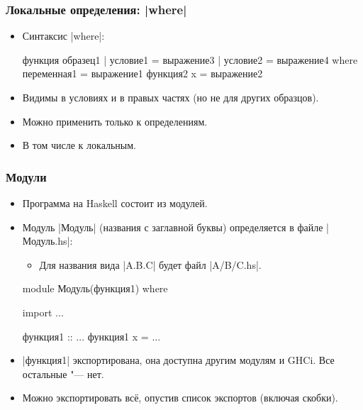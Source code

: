 \documentclass[10pt]{beamer}
\begin{document}
\begin{frame}[fragile]
  \frametitle{Локальные определения: \haskinline|where|}
  \begin{itemize}
    \item Синтаксис \haskinline|where|:
          \begin{haskell}
            функция образец1 | условие1 = выражение3
                             | условие2 = выражение4
                where переменная1 = выражение1
                      функция2 x = выражение2
          \end{haskell}
    \item Видимы в условиях и в правых частях (но не для других образцов).
    \item Можно применить только к определениям.
    \item В том числе к локальным.
  \end{itemize}
\end{frame}

\begin{frame}[fragile]
  \frametitle{Модули}
  \begin{itemize}
    \item Программа на Haskell состоит из модулей.
    \item Модуль \haskinline|Модуль| (названия с заглавной буквы) определяется в файле \haskinline|Модуль.hs|:
          \begin{itemize}
            \item Для названия вида \haskinline|A.B.C| будет файл \ghcinline|A/B/C.hs|.
          \end{itemize}
          \begin{haskell}
            module Модуль(функция1) where

            import ...

            функция1 :: ...
            функция1 x = ...
          \end{haskell}
    \item \haskinline|функция1| экспортирована, она доступна другим модулям и GHCi. Все остальные "--- нет.
    \item Можно экспортировать всё, опустив список экспортов (включая скобки).
  \end{itemize}
\end{frame}
\end{document}
